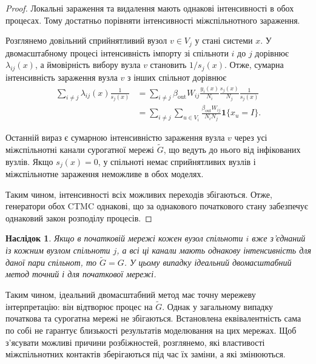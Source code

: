 \documentclass[a4paper,fleqn]{cas-sc}
\newtheorem{corollary}{Наслідок}
\newcommand{\ind}{\mathbf{1}}
\begin{document}
\begin{proof}
Локальні зараження та видалення мають однакові інтенсивності в обох процесах. Тому достатньо порівняти інтенсивності міжспільнотного зараження.

Розглянемо довільний сприйнятливий вузол $v\in V_j$ у стані системи $x$. У двомасштабному процесі інтенсивність імпорту зі спільноти $i$ до $j$ дорівнює $\lambda_{ij}(x)$, а ймовірність вибору вузла $v$ становить $1/s_j(x)$. Отже, сумарна інтенсивність зараження вузла $v$ з інших спільнот дорівнює
\[
\begin{aligned}
\sum_{i\neq j}\lambda_{ij}(x)\frac{1}{s_j(x)}
&=
\sum_{i\neq j}
\beta_{\mathrm{out}}W_{ij}
\frac{y_i(x)}{N_i}
\frac{s_j(x)}{N_j}
\frac{1}{s_j(x)}
\\
&=
\sum_{i\neq j}
\sum_{u\in V_i}
\frac{\beta_{\mathrm{out}}W_{ij}}{N_iN_j}
\ind\{x_u=I\}.
\end{aligned}
\]

Останній вираз є сумарною інтенсивністю зараження вузла $v$ через усі міжспільнотні канали сурогатної мережі $\tilde G$, що ведуть до нього від інфікованих вузлів. Якщо $s_j(x)=0$, у спільноті немає сприйнятливих вузлів і міжспільнотне зараження неможливе в обох моделях.

Таким чином, інтенсивності всіх можливих переходів збігаються. Отже, генератори обох CTMC однакові, що за однакового початкового стану забезпечує однаковий закон розподілу процесів.
\end{proof}

\begin{corollary}
\label{cor:exact}
Якщо в початковій мережі кожен вузол спільноти $i$ вже з'єднаний із кожним вузлом спільноти $j$, а всі ці канали мають однакову інтенсивність для даної пари спільнот, то $\tilde G=G$. У цьому випадку ідеальний двомасштабний метод точний і для початкової мережі.
\end{corollary}

Таким чином, ідеальний двомасштабний метод має точну мережеву інтерпретацію: він відтворює процес на $\tilde G$. Однак у загальному випадку початкова та сурогатна мережі не збігаються. Встановлена еквівалентність сама по собі не гарантує близькості результатів моделювання на цих мережах. Щоб з'ясувати можливі причини розбіжностей, розглянемо, які властивості міжспільнотних контактів зберігаються під час їх заміни, а які змінюються.
\end{document}
